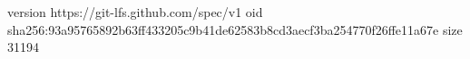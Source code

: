 version https://git-lfs.github.com/spec/v1
oid sha256:93a95765892b63ff433205c9b41de62583b8cd3aecf3ba254770f26ffe11a67e
size 31194
